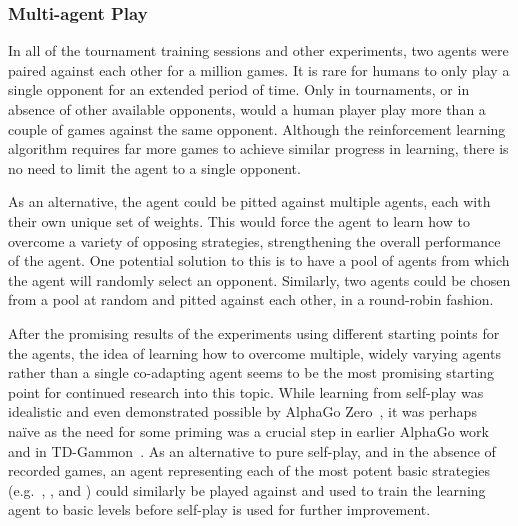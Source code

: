 
\subsubsection*{Multi-agent Play}
\label{sec:disc-future-rr}


In all of the tournament training sessions and other experiments,
two agents were paired against each other for a million games.
%
%
It is rare for humans to only play a single opponent
for an extended period of time.
%
Only in tournaments,
or in absence of other available opponents,
would a human player play more than a couple of games
against the same opponent.
%
Although the reinforcement learning algorithm requires far more games to
achieve similar progress in learning,
there is no need to limit the agent to a single opponent.

As an alternative,
the agent could be pitted against multiple agents,
each with their own unique set of
weights.
%
This would force the agent to learn how to overcome a variety of opposing
strategies,
strengthening the overall performance of the agent.
%
One potential solution to this is to have a pool of agents
from which the agent will randomly select an opponent.
%
Similarly,
two agents could be chosen from a pool at random and pitted against each
other,
in a round-robin fashion.

After the promising results of the experiments using different starting points
for the agents,
the idea of learning how to overcome multiple, widely varying agents
rather than a single co-adapting agent
seems to be the most promising starting point for continued research into this
topic.
%
While learning from self-play was idealistic
and even demonstrated possible by AlphaGo Zero~\cite{deepmind_alphago_zero},
it was perhaps naïve as
the need for some priming was a crucial step in earlier AlphaGo
work~\cite{deepmind_alphago} and in TD-Gammon~\cite{tdgammon}.
%
As an alternative to pure self-play,
and in the absence of recorded games,
an agent representing each of the most potent basic strategies
(e.g.\  \handmaxavg, \handmaxmin, and \handmaxposs)
could similarly be played against and used to train the learning agent
to basic levels before self-play is used for further improvement.

